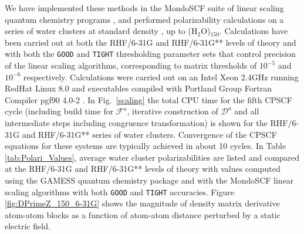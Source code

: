 \documentclass[prl,aps,twocolumn,showpacs,twocolumngrid,superbib]{revtex4}
\begin{document}
We have implemented these methods in the {\sc MondoSCF} suite of linear scaling quantum chemistry programs \cite{MondoSCF},
and performed polarizability calculations on a series of water clusters at standard density \cite{Water}, 
up to (H$_2$O)$_{150}$. Calculations have been carried out at both the RHF/6-31G and RHF/6-31G** levels of 
theory and with both the {\tt GOOD} and {\tt TIGHT} thresholding parameter sets that control precision of the 
linear scaling algorithms, corresponding to matrix thresholds of $10^{-5}$ and $10^{-6}$ respectively.  
Calculations were carried out on an Intel Xeon 2.4GHz running RedHat Linux 8.0 and  executables compiled 
with Portland Group Fortran Compiler pgf90 4.0-2 \cite{PGF90}. In Fig.~\ref{scaling} the 
total CPU time for the fifth CPSCF cycle (including build time for $\mathcal{F}^a$, 
iterative construction of $\mathcal{D}^a$ and all intermediate 
steps including congruence transformation) is shown for the RHF/6-31G and RHF/6-31G** series 
of water clusters.  Convergence of the CPSCF equations for these systems are typically 
achieved in about 10 cycles.  
In Table \ref{tab:Polari_Values},  average water cluster  polarizabilities are listed and compared at the RHF/6-31G 
and RHF/6-31G** levels of theory with values computed using the {\sc GAMESS} quantum chemistry package \cite{gamess} and 
with the {\sc MondoSCF} linear scaling algorithms with both {\tt GOOD} and {\tt TIGHT} accuracies.  
Figure \ref{fig:DPrimeZ_150_6-31G} shows the magnitude of density matrix derivative atom-atom blocks as a function of 
atom-atom distance perturbed by a static electric field.
\end{document}
